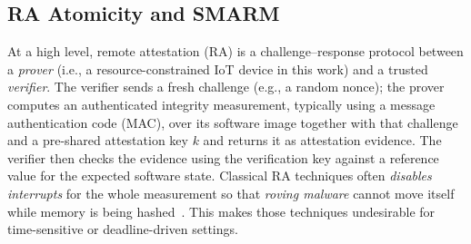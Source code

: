 \documentclass[conference]{IEEEtran}
\newcommand\oak[1]{\textcolor{red}{OAK: #1}}
\begin{document}
\subsection{RA Atomicity and SMARM}

At a high level, remote attestation (RA) is a challenge--response
protocol between a \emph{prover} (i.e., a resource-constrained IoT device in this work) and a trusted \emph{verifier}.
The verifier sends a fresh challenge (e.g., a random nonce); 
the prover computes an authenticated integrity measurement, typically using a message authentication code (MAC), over its software image together with that challenge and a pre-shared attestation key $k$ and returns it as attestation evidence. 
The verifier then checks the evidence using the verification key against a reference value for the expected software state.
Classical RA techniques often \emph{disables interrupts} for the whole measurement so that \emph{roving malware} cannot move itself while memory is being hashed~\cite{eldefrawy2012smart,nunes2019vrased}.
This makes those techniques undesirable for time-sensitive or deadline-driven settings.
\end{document}
